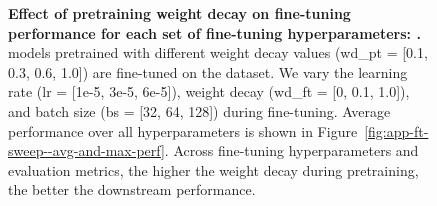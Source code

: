 \begin{figure}[h]
    \caption{{\bf Effect of pretraining weight decay on fine-tuning performance for each set of fine-tuning hyperparameters: \metamathqa{}.} 
    \olmoonex{} models pretrained with different weight decay values (wd\_pt = [0.1, 0.3, 0.6, 1.0]) are fine-tuned on the \metamathqa{} dataset. We vary the learning rate (lr = [1e-5, 3e-5, 6e-5]), weight decay (wd\_ft = [0, 0.1, 1.0]), and batch size (bs = [32, 64, 128]) during fine-tuning.
    Average performance over all hyperparameters is shown in Figure~\ref{fig:app-ft-sweep--avg-and-max-perf}. Across fine-tuning hyperparameters and evaluation metrics, the higher the weight decay during pretraining, the better the downstream performance.}
    \label{fig:app-ft-sweep--metamathqa}
\end{figure}



